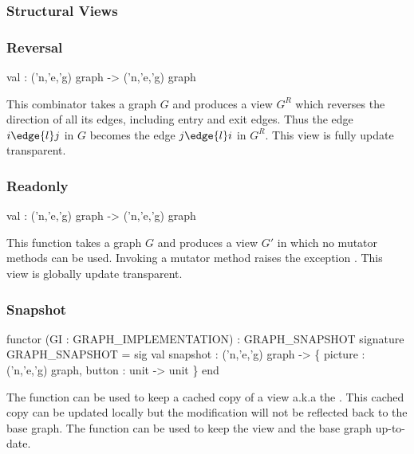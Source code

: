 \subsubsection{Structural Views}\label{sec:structural-views}

\subsubsection{Reversal}
\begin{SML}
   val  : ('n,'e,'g) graph -> ('n,'e,'g) graph
\end{SML}
   This combinator takes a graph $G$ and produces a view $G^R$
which reverses the direction
of all its edges, including entry and exit edges.  Thus 
the edge $i \edge{l} j$ in $G$ becomes the edge
$j \edge{l} i$ in $G^R$.  This view is fully update transparent.

\subsubsection{Readonly}
\begin{SML}
   val  : ('n,'e,'g) graph -> ('n,'e,'g) graph
\end{SML} 
  This function takes a graph $G$ and produces a view $G'$
in which no mutator methods can be used.  Invoking a mutator
method raises the exception .
This view is globally update transparent.

\subsubsection{Snapshot}
\begin{SML}
   functor (GI : GRAPH_IMPLEMENTATION) : GRAPH_SNAPSHOT 
   signature GRAPH_SNAPSHOT = sig
      val snapshot : ('n,'e,'g) graph -> 
        \{ picture : ('n,'e,'g) graph, button : unit -> unit \}
   end
\end{SML}

The function  can be used to keep a cached copy
of a view a.k.a the .    This cached copy
can be updated locally but the modification will not be reflected back
to the base graph.  The function  can be used to
keep the view and the base graph up-to-date.

